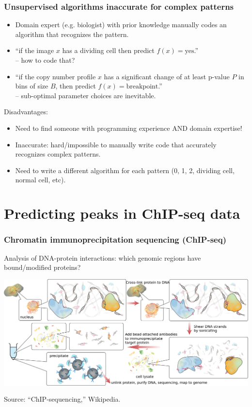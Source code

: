 \documentclass{beamer}
\begin{document}
\begin{frame}
  \frametitle{Unsupervised algorithms inaccurate for 
    complex patterns}
  \begin{itemize}
  \item Domain expert (e.g. biologist) with prior knowledge manually codes an
    algorithm that recognizes the pattern.
  \item ``if the image $x$ has a dividing cell then predict
    $f(x)=\text{yes}$.''\\
    -- how to code that?
  \item ``if the copy number profile $x$ has a significant change of
    at least p-value $P$ in bins of size $B$, then predict
    $f(x)=\text{breakpoint}$.''\\
    -- sub-optimal parameter choices are inevitable.
    \end{itemize}
Disadvantages:
\begin{itemize}
  \item Need to find someone with programming experience AND domain expertise!
  \item Inaccurate: hard/impossible to manually write code that
    accurately recognizes complex patterns.
  \item Need to write a different algorithm for each pattern (0, 1, 2,
    dividing cell, 
    normal cell,
    etc).
  \end{itemize}
\end{frame}

\section*{Predicting peaks in ChIP-seq data}

\begin{frame}
  \frametitle{Chromatin immunoprecipitation sequencing (ChIP-seq)}
  Analysis of DNA-protein interactions: which genomic regions have
  bound/modified proteins?

  \includegraphics[width=\textwidth]{Chromatin_immunoprecipitation_sequencing_wide.png}

  Source: ``ChIP-sequencing,'' Wikipedia.
\end{frame}
\end{document}
